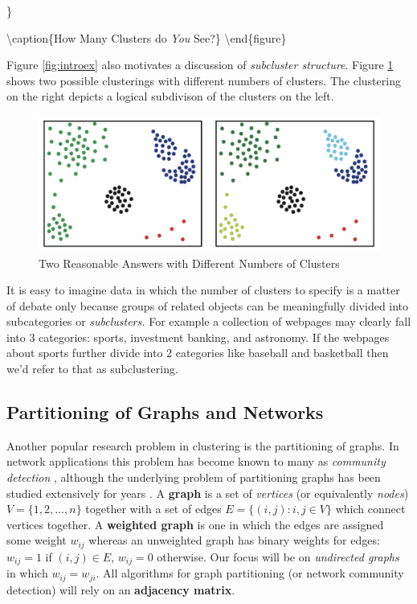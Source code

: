 \documentclass[
]{article}
\theoremstyle{definition}
\theoremstyle{definition}
\theoremstyle{definition}
\theoremstyle{definition}
\theoremstyle{remark}
\begin{document}
\}

\textbackslash caption\{How Many Clusters do \emph{You} See?\}\label{fig:introex}
\textbackslash end\{figure\}

Figure \ref{fig:introex} also motivates a discussion of \emph{subcluster structure}. Figure \ref{fig:introex12} shows two possible clusterings with different numbers of clusters. The clustering on the right depicts a logical subdivison of the clusters on the left.

\begin{figure}

{\centering \includegraphics[width=1\linewidth]{figs/introex12} 

}

\caption{Two Reasonable Answers with Different Numbers of Clusters}\label{fig:introex12}
\end{figure}

It is easy to imagine data in which the number of clusters to specify is a matter of debate only because groups of related objects can be meaningfully divided into subcategories or \emph{subclusters.} For example a collection of webpages may clearly fall into 3 categories: sports, investment banking, and astronomy. If the webpages about sports further divide into 2 categories like baseball and basketball then we'd refer to that as subclustering.

\hypertarget{partitioning-of-graphs-and-networks}{%
\subsection{Partitioning of Graphs and Networks}\label{partitioning-of-graphs-and-networks}}

Another popular research problem in clustering is the partitioning of graphs. In network applications this problem has become known to many as \emph{community detection} \cite{NCDnewman, NCDmucha, NCDmahoney}, although the underlying problem of partitioning graphs has been studied extensively for years \cite{drineassvd, FiedlerEV, chung, ng, poweriteration, pothen, minmax}. A \textbf{graph} is a set of \emph{vertices} (or equivalently \emph{nodes}) \(V=\{1,2,\dots, n\}\) together with a set of edges \(E=\{(i,j) : i,j \in V\}\) which connect vertices together. A \textbf{weighted graph} is one in which the edges are assigned some weight \(w_{ij}\) whereas an unweighted graph has binary weights for edges: \(w_{ij}=1\) if \((i,j) \in E\), \(w_{ij}=0\) otherwise. Our focus will be on \emph{undirected graphs} in which \(w_{ij}=w_{ji}\). All algorithms for graph partitioning (or network community detection) will rely on an \textbf{adjacency matrix}.
\end{document}
